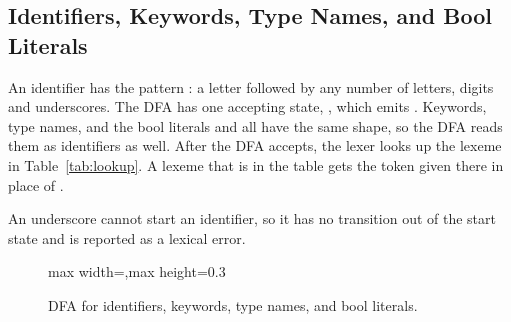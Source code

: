 \subsection{Identifiers, Keywords, Type Names, and Bool Literals}
\label{sec:ident}

\begin{sloppypar}
An identifier has the pattern \code{[a-zA-Z][a-zA-Z0-9\_]*}: a letter
followed by any number of letters, digits and underscores. The DFA has one
accepting state, , which emits . Keywords,
type names, and the bool literals  and  all have the
same shape, so the DFA reads them as identifiers as well. After the DFA
accepts, the lexer looks up the lexeme in Table~\ref{tab:lookup}. A lexeme
that is in the table gets the token given there in place of
.
\end{sloppypar}

An underscore cannot start an identifier, so it has no transition out of
the start state and is reported as a lexical error.

\begin{figure}[H]
\centering
\begin{adjustbox}{max width=\linewidth,max height=0.3\textheight}
\end{adjustbox}
\caption{DFA for identifiers, keywords, type names, and bool literals.}
\label{fig:dfa-ident}
\end{figure}

